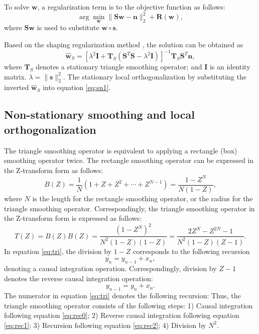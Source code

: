 To solve $\mathbf{w}$, a regularization term is  to the objective function as follows:
\begin{equation}
\label{eq:lowr}
\arg \min_{\mathbf{w}} \parallel  \mathbf{S}\mathbf{w} - \mathbf{n} \parallel_2^2 + \mathbf{R}(\mathbf{w}),
\end{equation} 
where $\mathbf{S}\mathbf{w}$ is used to substitute $\mathbf{w}\circ\mathbf{s}$.

Based on the shaping regularization method \cite[]{fomel2007shape}, the solution can be obtained as\new{:}
\begin{equation}
\label{eq:lowr2}
\hat{\mathbf{w}}_S = [\lambda^2 \mathbf{I} + \mathbf{T}_S (\mathbf{S}^T\mathbf{S} -\lambda^2 \mathbf{I})]^{-1}\mathbf{T}_S\mathbf{S}^T\mathbf{n}, 
\end{equation} 
where $\mathbf{T}_S$ denotes a stationary triangle smoothing operator; and $\mathbf{I}$ is an identity matrix. $\lambda=\parallel \mathbf{s} \parallel_2^2$.  The stationary local orthogonalization  by substituting the inverted $\hat{\mathbf{w}}_S$ into equation \ref{eq:sn1}.


\subsection{Non-stationary smoothing and local orthogonalization}
The triangle smoothing operator is equivalent to applying a rectangle (box) smoothing operator twice. 
The rectangle smoothing operator can be expressed in the Z-transform form as follows:
\begin{equation}
\label{eq:box}
B(Z) = \frac{1}{N} ( 1+ Z + Z^2 +\cdots+Z^{N-1}) = \frac{1-Z^N}{N(1-Z)},
\end{equation}
where $N$ is the length for the rectangle smoothing operator, or the radius for the triangle smoothing operator. Correspondingly, the triangle smoothing operator in the Z-transform form is expressed as follows:
\begin{equation}
\label{eq:tri}
T(Z) = B(Z)B(Z) = \frac{(1-Z^N)^2}{N^2(1-Z)(1-Z)} =\frac{2Z^N-Z^{2N}-1}{N^2(1-Z)(Z-1)}.
\end{equation}
In equation \ref{eq:tri}, the division by $1-Z$ corresponds to the following recursion
\begin{equation}
\label{eq:rec0}
y_n=y_{n-1}+x_n,
\end{equation}
denoting a causal integration operation.
Correspondingly, division by $Z-1$ denotes the reverse causal integration operation:
\begin{equation}
\label{eq:rec1}
y_{n-1}=y_{n}+x_n.
\end{equation}
The numerator in equation \ref{eq:tri} denotes the following recursion:
Thus, the triangle smoothing operator consists of the following steps: 
1) Causal integration following equation \ref{eq:rec0}; 2) Reverse causal integration following equation \ref{eq:rec1}; 3) Recursion following equation \ref{eq:rec2}; 4) Division by $N^2$. 

